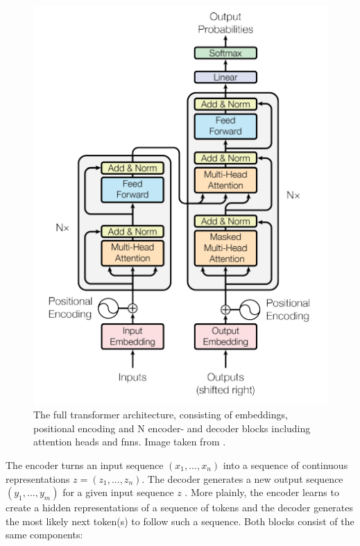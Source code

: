 \begin{figure}[h]
    \centering
    \includegraphics[width=\textwidth*2/3]{bilder/kapitel2/transformer.png}
    \caption{The full transformer architecture, consisting of embeddings, positional encoding and N encoder- and decoder blocks including attention heads and \acp{fnn}. Image taken from \cite{Vaswani.2017}.}
    \label{fig:transformer}
\end{figure}

The encoder turns an input sequence $(x_1, ..., x_n)$ into a sequence of continuous representations $z = (z_1, ..., z_n)$. The decoder generates a new output sequence $(y_1, ..., y_m)$ for a given input sequence $z$ \cite{Vaswani.2017, Cho.2014}.
More plainly, the encoder learns to create a hidden representations of a sequence of tokens and the decoder generates the most likely next token(s) to follow such a sequence.
Both blocks consist of the same components:

